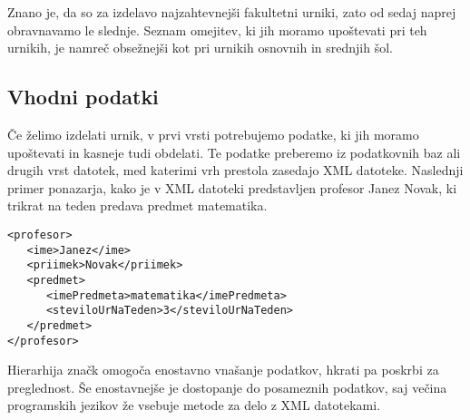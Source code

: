 \documentclass[10pt, a4paper]{article}
\begin{document}
Znano je, da so za izdelavo najzahtevnejši fakultetni urniki, zato od sedaj naprej
obravnavamo le slednje. Seznam omejitev, ki jih moramo upoštevati pri teh urnikih,
je namreč obsežnejši kot pri urnikih osnovnih in srednjih šol.

\subsection{Vhodni podatki}

Če želimo izdelati urnik, v prvi vrsti potrebujemo podatke, ki jih moramo upoštevati in
kasneje tudi obdelati. Te podatke preberemo iz podatkovnih baz ali drugih vrst datotek,
med katerimi vrh prestola zasedajo XML datoteke. Naslednji primer ponazarja, kako je v
XML datoteki predstavljen profesor Janez Novak, ki trikrat na teden predava predmet
matematika.

\begin{verbatim}
<profesor>
   <ime>Janez</ime>
   <priimek>Novak</priimek>
   <predmet>
      <imePredmeta>matematika</imePredmeta>
      <steviloUrNaTeden>3</steviloUrNaTeden>
   </predmet>
</profesor>
\end{verbatim}
\noindent
Hierarhija značk omogoča enostavno vnašanje podatkov, hkrati pa poskrbi za preglednost.
Še enostavnejše je dostopanje do posameznih podatkov, saj večina programskih jezikov že
vsebuje metode za delo z XML datotekami.
\end{document}
